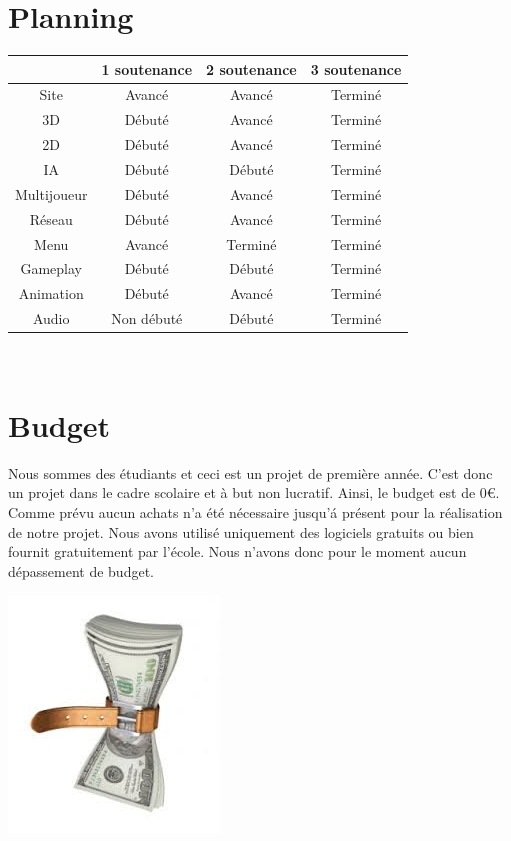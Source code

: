 \documentclass[a4paper, 12pt]{article}
\begin{document}
\section{Planning}
	\begin{tabular}{|c||c|c|c|}
		\hline
		& 1\iere{} soutenance & 2\ieme{} soutenance & 3\ieme{} soutenance \\
		\hline
		Site &  Avancé & Avancé & Terminé \\
		\hline
		3D & Débuté & Avancé & Terminé \\
		\hline
		2D & Débuté & Avancé & Terminé \\
		\hline
		IA & Débuté & Débuté & Terminé\\
		\hline
		Multijoueur & Débuté & Avancé & Terminé\\
		\hline
		Réseau & Débuté & Avancé & Terminé\\
		\hline
		Menu & Avancé & Terminé & Terminé \\
		\hline
		Gameplay & Débuté & Débuté & Terminé\\
		\hline
		Animation & Débuté & Avancé & Terminé\\		
		\hline
		Audio & Non débuté & Débuté & Terminé\\
		\hline		
	\end{tabular}\\
	\newpage
\section{Budget}

Nous sommes des étudiants et ceci est un projet de première année. C'est donc un projet dans le cadre scolaire et à but non lucratif. Ainsi, le budget est de 0\euro{}. Comme prévu aucun achats n'a été nécessaire jusqu'\'a présent pour la réalisation de notre projet. Nous avons utilisé uniquement des logiciels gratuits ou bien fournit gratuitement par l'école. Nous n'avons donc pour le moment aucun dépassement de budget.\\

\centerline{\includegraphics[scale=0.7]{images.jpg}}
\end{document}
